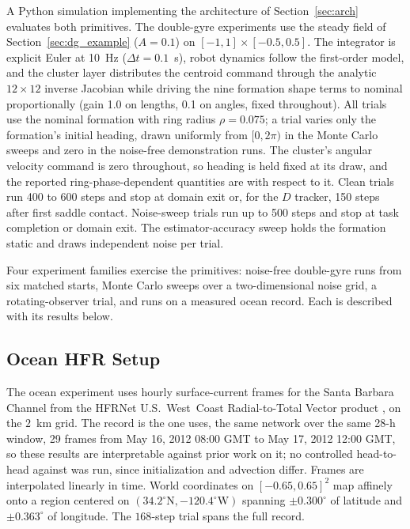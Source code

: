 \documentclass[lettersize,journal]{IEEEtran}
\begin{document}
A Python simulation implementing the architecture of
Section~\ref{sec:arch} evaluates both primitives.
The double-gyre experiments use the steady field of
Section~\ref{sec:dg_example} ($A = 0.1$) on $[-1, 1] \times
[-0.5, 0.5]$. The integrator is explicit Euler at 10~Hz ($\Delta t =
0.1$~s), robot dynamics follow the first-order model, and the cluster
layer distributes the centroid command through the analytic $12 \times
12$ inverse Jacobian while driving the nine formation shape terms to
nominal proportionally (gain 1.0 on lengths, 0.1 on angles, fixed
throughout). All trials use the nominal
formation with ring radius $\rho = 0.075$; a trial varies only the
formation's initial heading, drawn uniformly from $[0, 2\pi)$ in the
Monte Carlo sweeps and zero in the noise-free demonstration runs. The
cluster's angular velocity command is zero throughout, so
heading is held fixed at its draw, and the reported
ring-phase-dependent quantities are with respect to it. Clean trials
run 400 to 600 steps and stop at domain exit or, for the $D$ tracker,
150 steps after first saddle contact. Noise-sweep trials run up to 500
steps and stop at task completion or domain exit. The
estimator-accuracy sweep holds the formation static and draws
independent noise per trial.

Four experiment families exercise the primitives: noise-free
double-gyre runs from six matched starts, Monte Carlo sweeps over a
two-dimensional noise grid, a rotating-observer trial, and runs on a
measured ocean record. Each is described with its results below.

\subsection{Ocean HFR Setup}
\label{sec:ocean_sim}

The ocean experiment uses hourly surface-current frames for the Santa
Barbara Channel from the HFRNet U.S.~West~Coast Radial-to-Total Vector
product \cite{35}, on the $2$~km grid. The record is the one
\cite{26} uses, the same network over the same 28-h window, 29 frames
from May 16, 2012 08:00 GMT to May 17, 2012 12:00 GMT, so these results
are interpretable against prior work on it; no controlled head-to-head
against \cite{26} was run, since initialization and advection differ.
Frames are interpolated linearly in time. World
coordinates on $[-0.65, 0.65]^2$ map affinely onto a region centered on
$(34.2^{\circ}\mathrm{N}, -120.4^{\circ}\mathrm{W})$ spanning
$\pm 0.300^{\circ}$ of latitude and $\pm 0.363^{\circ}$ of longitude. The
$168$-step trial spans the full record.
\end{document}

